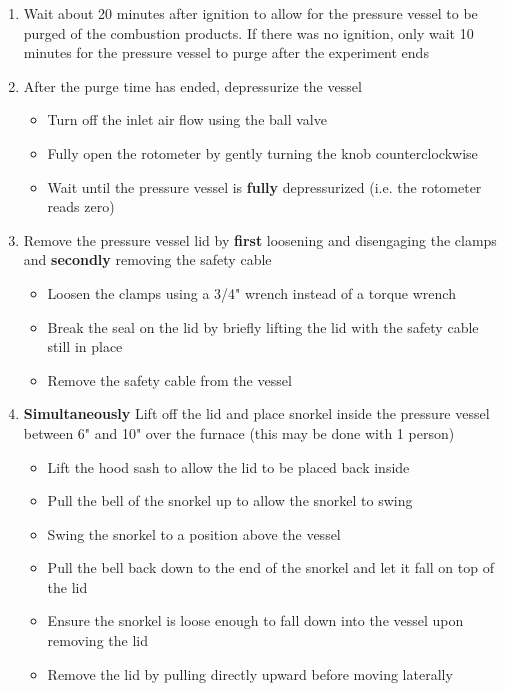 \documentclass[letterpaper,11pt]{article}
\begin{document}
\begin{enumerate}
    \item Wait about 20 minutes after ignition to allow for the pressure 
        vessel to be purged of the combustion products. If there was no ignition,
		only wait 10 minutes for the pressure vessel to purge after the experiment ends 
    \item After the purge time has ended, depressurize the vessel
        \begin{itemize}
        \item Turn off the inlet air flow using the ball valve
        \item Fully open the rotometer by gently turning the knob counterclockwise
		\item Wait until the pressure vessel is \textbf{fully} depressurized 
            (i.e. the rotometer reads zero)
        \end{itemize}
    \item Remove the pressure vessel lid by \textbf{first} loosening and 
        disengaging the clamps and \textbf{secondly} removing the safety cable
        \begin{itemize}
        \item Loosen the clamps using a 3/4" wrench instead of a 
            torque wrench
		\item Break the seal on the lid by briefly lifting the lid with the safety cable still in 
                place
        \item Remove the safety cable from the vessel
        \end{itemize}
    \item \textbf{Simultaneously} Lift off the lid and place snorkel inside the pressure vessel 
        between 6" and 10" over the furnace (this may be done with 1 person)
        \begin{itemize}
        \item Lift the hood sash to allow the lid to be placed back inside
        \item Pull the bell of the snorkel up to allow the snorkel to swing 
        \item Swing the snorkel to a position above the vessel
        \item Pull the bell back down to the end of the snorkel and let it fall
            on top of the lid
        \item Ensure the snorkel is loose enough to fall down into the vessel
            upon removing the lid
        \item Remove the lid by pulling directly upward before moving laterally

\end{itemize}
\end{enumerate}
\end{document}
